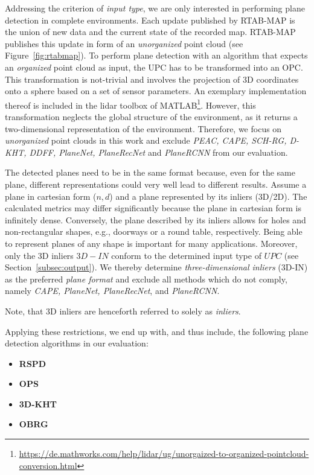 \documentclass[main.tex]{subfiles}
\begin{document}
Addressing the criterion of \textit{input type}, we are only interested in performing plane detection in complete environments.
Each update published by RTAB-MAP is the union of new data and the current state of the recorded map. RTAB-MAP publishes this update
in form of an \textit{unorganized} point cloud (see Figure~\ref{fig:rtabmap}).
To perform plane detection with an algorithm that expects an \textit{organized} point cloud as input, the UPC has to be transformed into an OPC.
This transformation is not-trivial and involves the projection of 3D coordinates onto a sphere based on a set of sensor parameters.
An exemplary implementation thereof is included in the lidar toolbox of MATLAB\footnote{\href{https://de.mathworks.com/help/lidar/ug/unorgaized-to-organized-pointcloud-conversion.html}{https://de.mathworks.com/help/lidar/ug/unorgaized-to-organized-pointcloud-conversion.html}}.
However, this transformation neglects the global structure of the environment, as it returns a two-dimensional representation of the environment.
Therefore, we focus on \textit{unorganized} point clouds in this work and exclude \textit{PEAC, CAPE, SCH-RG, D-KHT, DDFF, PlaneNet, PlaneRecNet} and \textit{PlaneRCNN} from our evaluation.

The detected planes need to be in the same format because, even for the same plane, different representations could very well lead to different results.
Assume a plane in cartesian form ($n,d$) and a plane represented by its inliers (3D/2D). The calculated metrics may differ significantly because the plane in cartesian form is infinitely dense.
Conversely, the plane described by its inliers allows for holes and non-rectangular shapes, e.g., doorways or a round table, respectively.
Being able to represent planes of any shape is important for many applications. Moreover, only the 3D inliers $3D-IN$ conform to
the determined input type of $UPC$ (see Section~\ref{subsec:output}).
We thereby determine \textit{three-dimensional inliers} (3D-IN) as the preferred \textit{plane format} and exclude all methods which do not comply, namely \textit{CAPE, PlaneNet, PlaneRecNet}, and \textit{PlaneRCNN}.

Note, that 3D inliers are henceforth referred to solely as \textit{inliers}. 


Applying these restrictions, we end up with, and thus include, the following plane detection algorithms in our evaluation:

\begin{itemize}
    \item \textbf{RSPD}
    \item \textbf{OPS}
    \item \textbf{3D-KHT}
    \item \textbf{OBRG}
\end{itemize}
\end{document}

